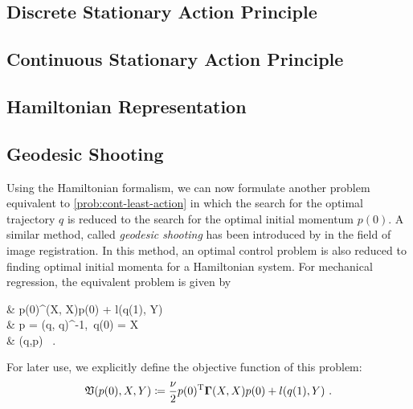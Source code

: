 \subsection{Discrete Stationary Action Principle}



\subsection{Continuous Stationary Action Principle}



\subsection{Hamiltonian Representation}



\subsection{Geodesic Shooting}

Using the Hamiltonian formalism, we can now formulate another problem equivalent to \cref{prob:cont-least-action} in which the search for the optimal trajectory $q$ is reduced to the search for the optimal initial momentum $p(0)$.
A similar method, called \emph{geodesic shooting} has been introduced by \citet{allassonniere05} in the field of image registration.
In this method, an optimal control problem is also reduced to finding optimal initial momenta for a Hamiltonian system.
For mechanical regression, the equivalent problem is given by
\begin{problem}
	\label{prob:geodesic-shooting}
	\begin{cases}
		&  p(0)^\T \bGamma(X, X)p(0) + l(q(1), Y)\\
		 & p = \bGamma(q, q)^{-1},\ q(0) = X \\
		& (q,p)  \ .
	\end{cases}
\end{problem}
For later use, we explicitly define the objective function of this problem:
\begin{equation}
\label{eq:geodesic-shooting-objective}
\mathfrak{V}(p(0), X, Y) \coloneqq \frac{\nu}{2} p(0)^{\mathrm{T}} \mathbf{\Gamma}(X, X)p(0) + l(q(1), Y) \ .
\end{equation}

